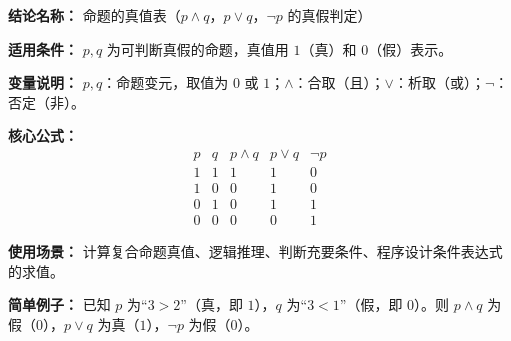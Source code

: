 \textbf{结论名称：} 命题的真值表（$p \land q$，$p \lor q$，$\lnot p$ 的真假判定）

\textbf{适用条件：} $p, q$ 为可判断真假的命题，真值用 $1$（真）和 $0$（假）表示。

\textbf{变量说明：} $p, q$：命题变元，取值为 $0$ 或 $1$；$\land$：合取（且）；$\lor$：析取（或）；$\lnot$：否定（非）。

\textbf{核心公式：}
\[
\boxed{
\begin{array}{cc|c|c|c}
p & q & p \land q & p \lor q & \lnot p \\
\hline
1 & 1 & 1 & 1 & 0 \\
1 & 0 & 0 & 1 & 0 \\
0 & 1 & 0 & 1 & 1 \\
0 & 0 & 0 & 0 & 1
\end{array}
}
\]

\textbf{使用场景：} 计算复合命题真值、逻辑推理、判断充要条件、程序设计条件表达式的求值。

\textbf{简单例子：} 已知 $p$ 为“$3>2$”（真，即 $1$），$q$ 为“$3<1$”（假，即 $0$）。则 $p \land q$ 为假（$0$），$p \lor q$ 为真（$1$），$\lnot p$ 为假（$0$）。